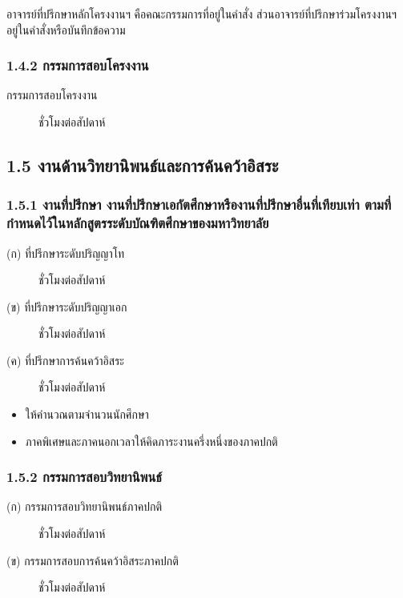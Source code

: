 \documentclass[a4paper,12pt,english]{sphinxmanual}
\begin{document}
อาจารย์ที่ปรึกษาหลักโครงงานฯ คือคณะกรรมการที่อยู่ในคำสั่ง ส่วนอาจารย์ที่ปรึกษาร่วมโครงงานฯ อยู่ในคำสั่งหรือบันทึกข้อความ


\subsubsection{1.4.2 กรรมการสอบโครงงาน}
\label{\detokenize{workload_rubric:id17}}\begin{description}
\item[{กรรมการสอบโครงงาน}]  ชั่วโมงต่อสัปดาห์

\end{description}


\subsection{1.5 งานด้านวิทยานิพนธ์และการค้นคว้าอิสระ}
\label{\detokenize{workload_rubric:id18}}

\subsubsection{1.5.1 งานที่ปรึกษา งานที่ปรึกษาเอกัตศึกษาหรืองานที่ปรึกษาอื่นที่เทียบเท่า ตามที่กำหนดไว้ในหลักสูตรระดับบัณฑิตศึกษาของมหาวิทยาลัย}
\label{\detokenize{workload_rubric:id19}}\begin{description}
\item[{(ก) ที่ปรึกษาระดับปริญญาโท}]  ชั่วโมงต่อสัปดาห์

\item[{(ข) ที่ปรึกษาระดับปริญญาเอก}]  ชั่วโมงต่อสัปดาห์

\item[{(ค) ที่ปรึกษาการค้นคว้าอิสระ}]  ชั่วโมงต่อสัปดาห์

\end{description}
\begin{itemize}
\item {} 
ให้คำนวณตามจำนวนนักศึกษา

\item {} 
ภาคพิเศษและภาคนอกเวลาให้คิดภาระงานครึ่งหนึ่งของภาคปกติ

\end{itemize}


\subsubsection{1.5.2 กรรมการสอบวิทยานิพนธ์}
\label{\detokenize{workload_rubric:id20}}\begin{description}
\item[{(ก) กรรมการสอบวิทยานิพนธ์ภาคปกติ}]  ชั่วโมงต่อสัปดาห์

\item[{(ข) กรรมการสอบการค้นคว้าอิสระภาคปกติ}]  ชั่วโมงต่อสัปดาห์

\end{description}
\end{document}
